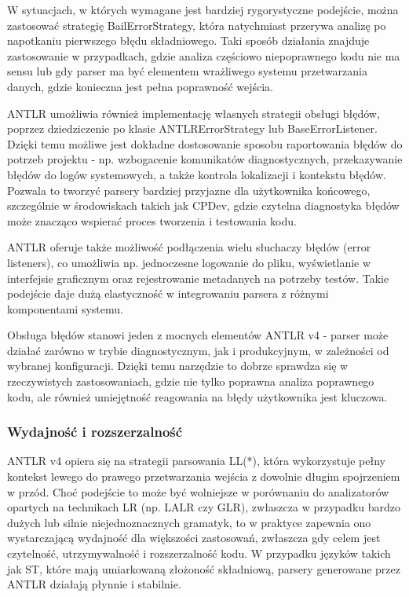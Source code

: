 \documentclass[12pt,twoside]{article}
\begin{document}
W sytuacjach, w których wymagane jest bardziej rygorystyczne podejście, można zastosować strategię BailErrorStrategy, która natychmiast przerywa analizę po napotkaniu pierwszego błędu składniowego. Taki sposób działania znajduje zastosowanie w przypadkach, gdzie analiza częściowo niepoprawnego kodu nie ma sensu lub gdy parser ma być elementem wrażliwego systemu przetwarzania danych, gdzie konieczna jest pełna poprawność wejścia.

ANTLR umożliwia również implementację własnych strategii obsługi błędów, poprzez dziedziczenie po klasie ANTLRErrorStrategy lub BaseErrorListener. Dzięki temu możliwe jest dokładne dostosowanie sposobu raportowania błędów do potrzeb projektu - np. wzbogacenie komunikatów diagnostycznych, przekazywanie błędów do logów systemowych, a także kontrola lokalizacji i kontekstu błędów. Pozwala to tworzyć parsery bardziej przyjazne dla użytkownika końcowego, szczególnie w środowiskach takich jak CPDev, gdzie czytelna diagnostyka błędów może znacząco wspierać proces tworzenia i testowania kodu.

ANTLR oferuje także możliwość podłączenia wielu słuchaczy błędów (error listeners), co umożliwia np. jednoczesne logowanie do pliku, wyświetlanie w interfejsie graficznym oraz rejestrowanie metadanych na potrzeby testów. Takie podejście daje dużą elastyczność w integrowaniu parsera z różnymi komponentami systemu.

Obsługa błędów stanowi jeden z mocnych elementów ANTLR v4 - parser może działać zarówno w trybie diagnostycznym, jak i produkcyjnym, w zależności od wybranej konfiguracji. Dzięki temu narzędzie to dobrze sprawdza się w rzeczywistych zastosowaniach, gdzie nie tylko poprawna analiza poprawnego kodu, ale również umiejętność reagowania na błędy użytkownika jest kluczowa.
\subsubsection{Wydajność i rozszerzalność}
ANTLR v4 opiera się na strategii parsowania LL(*), która wykorzystuje pełny kontekst lewego do prawego przetwarzania wejścia z dowolnie długim spojrzeniem w przód. Choć podejście to może być wolniejsze w porównaniu do analizatorów opartych na technikach LR (np. LALR czy GLR), zwłaszcza w przypadku bardzo dużych lub silnie niejednoznacznych gramatyk, to w praktyce zapewnia ono wystarczającą wydajność dla większości zastosowań, zwłaszcza gdy celem jest czytelność, utrzymywalność i rozszerzalność kodu. W przypadku języków takich jak ST, które mają umiarkowaną złożoność składniową, parsery generowane przez ANTLR działają płynnie i stabilnie.
\end{document}
